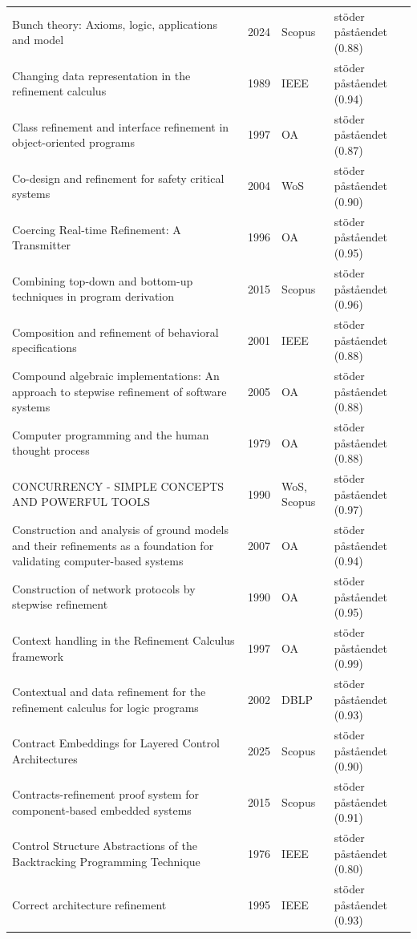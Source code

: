 \begin{longtable}{@{}%
  >{\raggedright\arraybackslash}p{}c%
  >{\raggedright\arraybackslash}p{}%
  >{\raggedright\arraybackslash}p{}@{}}
Bunch theory: Axioms, logic, applications and model & 2024 & Scopus & stöder påståendet (0.88) \\
Changing data representation in the refinement calculus & 1989 & IEEE & stöder påståendet (0.94) \\
Class refinement and interface refinement in object-oriented programs & 1997 & OA & stöder påståendet (0.87) \\
Co-design and refinement for safety critical systems & 2004 & WoS & stöder påståendet (0.90) \\
Coercing Real-time Refinement: A Transmitter & 1996 & OA & stöder påståendet (0.95) \\
Combining top-down and bottom-up techniques in program derivation & 2015 & Scopus & stöder påståendet (0.96) \\
Composition and refinement of behavioral specifications & 2001 & IEEE & stöder påståendet (0.88) \\
Compound algebraic implementations: An approach to stepwise refinement of software systems & 2005 & OA & stöder påståendet (0.88) \\
Computer programming and the human thought process & 1979 & OA & stöder påståendet (0.88) \\
CONCURRENCY - SIMPLE CONCEPTS AND POWERFUL TOOLS & 1990 & WoS, Scopus & stöder påståendet (0.97) \\
Construction and analysis of ground models and their refinements as a foundation for validating computer-based systems & 2007 & OA & stöder påståendet (0.94) \\
Construction of network protocols by stepwise refinement & 1990 & OA & stöder påståendet (0.95) \\
Context handling in the Refinement Calculus framework & 1997 & OA & stöder påståendet (0.99) \\
Contextual and data refinement for the refinement calculus for logic programs & 2002 & DBLP & stöder påståendet (0.93) \\
Contract Embeddings for Layered Control Architectures & 2025 & Scopus & stöder påståendet (0.90) \\
Contracts-refinement proof system for component-based embedded systems & 2015 & Scopus & stöder påståendet (0.91) \\
Control Structure Abstractions of the Backtracking Programming Technique & 1976 & IEEE & stöder påståendet (0.80) \\
Correct architecture refinement & 1995 & IEEE & stöder påståendet (0.93) \\

\end{longtable}
